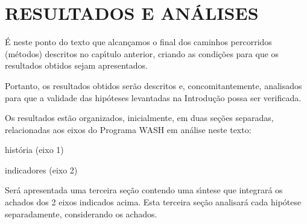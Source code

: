 \documentclass[
12pt,		%
openright,	%
twoside,  %
a4paper,			%
chapter=TITLE,		%
english,			%
french,				%
spanish,			%
brazil				%
]{USPSC-classe/USPSC}
\begin{document}
\chapter[RESULTADOS E AN\'ALISES]{RESULTADOS E AN\'ALISES}\label{RESULTADOS E AN\'ALISES}
\'E neste ponto do texto que alcan\c{c}amos o final dos caminhos percorridos (m\'etodos) descritos no cap\'{\i}tulo anterior, criando as condi\c{c}\~oes para que os resultados obtidos sejam apresentados.

















Portanto, os resultados obtidos ser\~ao descritos e, concomitantemente, analisados para que a validade das hip\'oteses levantadas na Introdu\c{c}\~ao possa ser verificada.

















Os resultados est\~ao organizados, inicialmente, em duas se\c{c}\~oes separadas, relacionadas aos eixos do Programa WASH em an\'alise neste texto:


















\begin{alineas}
\item hist\'oria (eixo 1)
\item indicadores (eixo 2)
\end{alineas}

Ser\'a apresentada uma terceira se\c{c}\~ao contendo uma s\'{\i}ntese que integrar\'a os achados dos 2 eixos indicados acima. Esta terceira se\c{c}\~ao analisar\'a cada hip\'otese separadamente, considerando os achados.
\end{document}

